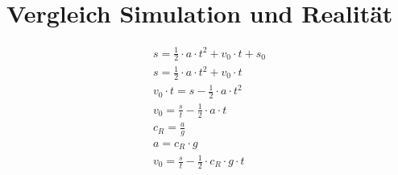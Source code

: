 \section{Vergleich Simulation und Realität}

\begin{align}
    s = \frac{1}{2} \cdot a \cdot t^2 + v_0 \cdot t + s_0\\
    s = \frac{1}{2} \cdot a \cdot t^2 + v_0 \cdot t\\
    v_0 \cdot t = s - \frac{1}{2} \cdot a \cdot t^2\\
    v_0 = \frac{s}{t} - \frac{1}{2} \cdot a \cdot t\\
    c_R = \frac{a}{g}\\
    a = c_R \cdot g\\
    v_0 = \frac{s}{t} - \frac{1}{2} \cdot c_R \cdot g \cdot t\\
\end{align}
